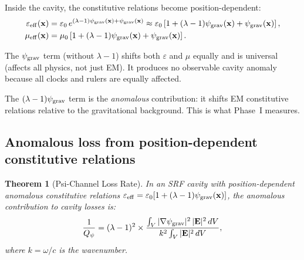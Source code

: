 \documentclass[11pt]{article}
\newcommand{\lam}{\lambda}
\newcommand{\Qpsi}{Q_\psi}
\newcommand{\psigrav}{\psi_{\rm grav}}
\newtheorem{theorem}{Theorem}[section]
\theoremstyle{definition}
\theoremstyle{remark}
\begin{document}
Inside the cavity, the constitutive relations become position-dependent:
\begin{align}
\varepsilon_{\rm eff}(\mathbf{x}) &= \varepsilon_0\,e^{(\lam-1)\psigrav(\mathbf{x})
+ \psigrav(\mathbf{x})}
\approx \varepsilon_0\left[1 + (\lam-1)\psigrav(\mathbf{x}) +
\psigrav(\mathbf{x})\right], \\
\mu_{\rm eff}(\mathbf{x}) &= \mu_0\left[1 + (\lam-1)\psigrav(\mathbf{x}) +
\psigrav(\mathbf{x})\right].
\end{align}

The $\psigrav$ term (without $\lam-1$) shifts both $\varepsilon$ and
$\mu$ equally and is universal (affects all physics, not just EM). It
produces no observable cavity anomaly because all clocks and rulers
are equally affected.

The $(\lam-1)\psigrav$ term is the \emph{anomalous} contribution: it
shifts EM constitutive relations relative to the gravitational
background. This is what Phase~I measures.


\subsection{Anomalous loss from position-dependent constitutive relations}

\begin{theorem}[Psi-Channel Loss Rate]
\label{thm:psi_loss}
In an SRF cavity with position-dependent anomalous constitutive
relations $\varepsilon_{\rm eff} = \varepsilon_0[1 + (\lam-1)\psigrav(\mathbf{x})]$,
the anomalous contribution to cavity losses is:
\begin{equation}
\frac{1}{\Qpsi} = (\lam-1)^2 \times
\frac{\int_V |\nabla\psigrav|^2\,|\mathbf{E}|^2\,dV}
{k^2\int_V |\mathbf{E}|^2\,dV},
\label{eq:Q_psi_general}
\end{equation}
where $k = \omega/c$ is the wavenumber.
\end{theorem}
\end{document}
